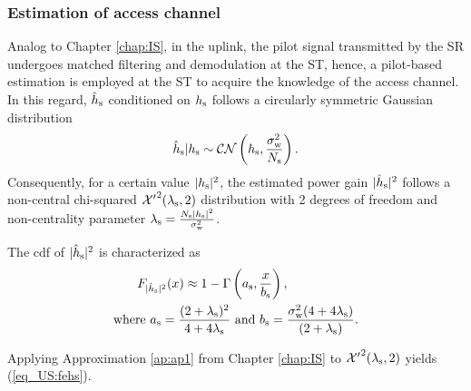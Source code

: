 \subsubsection{Estimation of access channel}
Analog to Chapter \ref{chap:IS}, in the uplink, the pilot signal transmitted by the SR undergoes matched filtering and demodulation at the ST, hence, a pilot-based estimation is employed at the ST to acquire the knowledge of the access channel. %
In this regard, $\hat{h}_{\text{s}}$ conditioned on $h_{\text{s}}$ follows a circularly symmetric Gaussian distribution
\begin{align}
\hat{h}_{\text{s}}|h_{\text{s}} \sim \mathcal{C} \mathcal{N}\left( h_{\text{s}},\frac{\sigma^2_{\text{w}}}{N_{\text{s}}} \right).
\label{eq_US:ehs} 
\end{align}
Consequently, for a certain value $|h_{\text{s}}|^2$, the estimated power gain $|\hat{h}_{\text{s}}|^2$ follows a non-central chi-squared $\ncchi2(\ls, 2)$ distribution with 2 degrees of freedom and non-centrality parameter $\lambda_{\text{s}} = \frac{N_{\text{s}} |h_{\text{s}}|^2}{\sigma^2_{\text{w}}}$. 
\begin{lemma} \label{lm_US:lm2}
\normalfont
The cdf of $|\hat{h}_{\text{s}}|^2$ is characterized as 
\begin{align}
F_{|\hat{h}_{\text{s}}|^2}(x) \approx 1 - \Gamma&\left(a_{\text{s}}, \frac{x}{b_{\text{s}}}\right) \label{eq_US:fehs},\\ 
\text{where  } a_{\text{s}} = \frac{(2 + \lambda_{\text{s}})^2}{4 + 4 \lambda_{\text{s}}} &\text{ and } b_{\text{s}} = \frac{\sigma^2_{\text{w}} (4 + 4 \lambda_{\text{s}})}{(2 + \lambda_{\text{s}})}. \label{eq_US:para_s} 
\end{align} 
\end{lemma}
\begin{IEEEproof}[Solution]
Applying Approximation \ref{ap:ap1} from Chapter \ref{chap:IS} to $\ncchi2(\ls, 2)$ yields (\ref{eq_US:fehs}). 
\end{IEEEproof}


